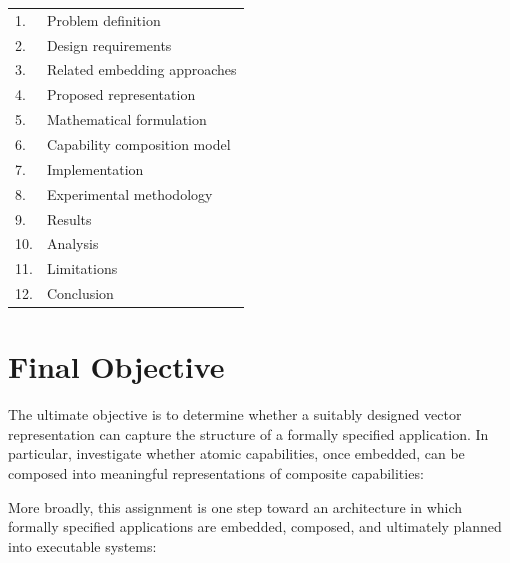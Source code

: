 \documentclass[11pt]{article}
\begin{document}
\begin{tabularx}{\textwidth}{@{}L{0.8cm}Y@{}}
1. & Problem definition \\[0.3em]
2. & Design requirements \\[0.3em]
3. & Related embedding approaches \\[0.3em]
4. & Proposed representation \\[0.3em]
5. & Mathematical formulation \\[0.3em]
6. & Capability composition model \\[0.3em]
7. & Implementation \\[0.3em]
8. & Experimental methodology \\[0.3em]
9. & Results \\[0.3em]
10. & Analysis \\[0.3em]
11. & Limitations \\[0.3em]
12. & Conclusion
\end{tabularx}

\clearpage
\section{Final Objective}

The ultimate objective is to determine whether a suitably designed vector representation
can capture the structure of a formally specified application. In particular, investigate
whether atomic capabilities, once embedded, can be composed into meaningful
representations of composite capabilities:

\begin{center}
\end{center}

More broadly, this assignment is one step toward an architecture in which formally
specified applications are embedded, composed, and ultimately planned into executable
systems:
\end{document}
